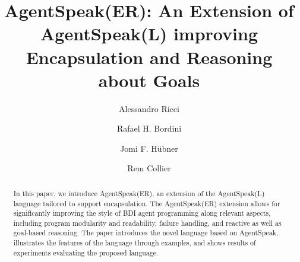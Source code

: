 \documentclass{llncs}
\begin{document}
\title{AgentSpeak(ER): An Extension of AgentSpeak(L) improving
  Encapsulation and Reasoning about Goals}




\author{Alessandro Ricci \and Rafael H. Bordini \and  Jomi F. H\"ubner \and Rem Collier}


\maketitle

\begin{abstract}  
  In this paper, we introduce AgentSpeak(ER), an extension of the
  AgentSpeak(L) language tailored to support encapsulation. The
  AgentSpeak(ER) extension allows for significantly improving the
  style of BDI agent programming along relevant aspects, including
  program modularity and readability, failure handling, and reactive
  as well as goal-based reasoning. The paper introduces the novel
  language based on AgentSpeak, %
  illustrates the features of the language through
  examples, and shows results of experiments evaluating the proposed
  language.
\end{abstract}








% 








\end{document}
